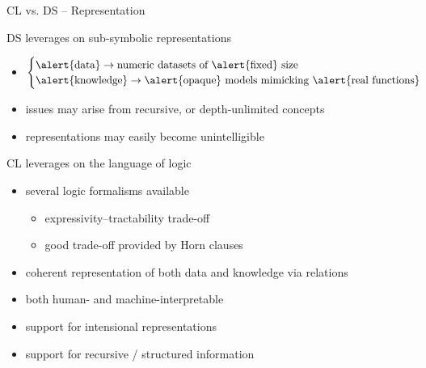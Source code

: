 \documentclass[presentation]{beamer}\mode<presentation>{\usetheme{AMSBolognaFC}}
\begin{document}
\begin{frame}[allowframebreaks]{CL vs. DS -- Representation}
    \begin{block}{DS leverages on sub-symbolic representations}
        \begin{itemize}
            \item $\begin{cases}
                \alert{\text{data}} \rightarrow \text{numeric datasets of \alert{fixed} size}
                \\
                \alert{\text{knowledge}} \rightarrow \text{\alert{opaque} models mimicking \alert{real functions}}
            \end{cases}$
            \item issues may arise from \alert{recursive}, or \alert{depth-unlimited} concepts
            \item representations may easily become \alert{unintelligible} 
        \end{itemize}
    \end{block}

    \begin{block}{CL leverages on the language of logic}
        \begin{itemize}
            \item several \alert{logic formalisms} available
            \begin{itemize}
                \item \alert{expressivity--tractability} trade-off
                \item good trade-off provided by \alert{Horn clauses}
            \end{itemize}
            \item coherent representation of \alert{both} data and knowledge via relations
            \item both human- and machine-\alert{interpretable}
            \item support for \alert{intensional} representations
            \item support for \alert{recursive} / structured information
            \end{itemize}
    \end{block}
\end{frame}
\end{document}
